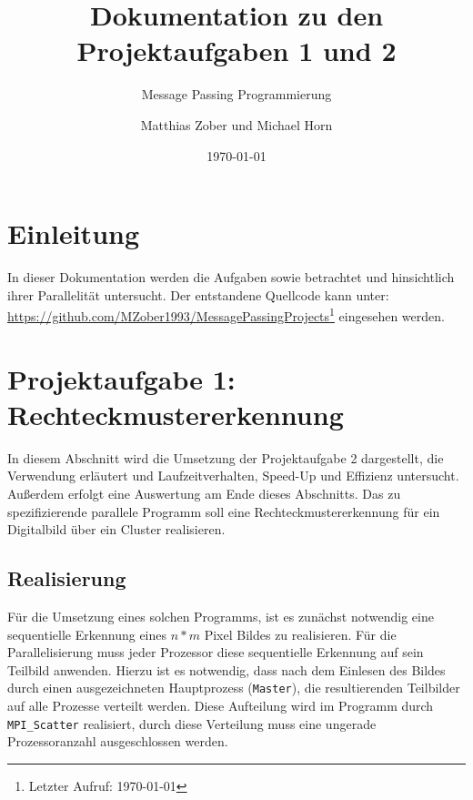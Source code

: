 	
					
\title{Dokumentation zu den Projektaufgaben 1 und 2}
\subtitle{Message Passing Programmierung}

\author{Matthias Zober und Michael Horn}
\date{\today}

\maketitle

\tableofcontents
\pagebreak

\section{Einleitung}
In dieser Dokumentation werden die Aufgaben  sowie  betrachtet und hinsichtlich ihrer Parallelität untersucht.
Der entstandene Quellcode kann unter:\\
\url{https://github.com/MZober1993/MessagePassingProjects}\footnote{Letzter Aufruf: \today}
eingesehen werden.
\section{Projektaufgabe 1: Rechteckmustererkennung}
In diesem Abschnitt wird die Umsetzung der Projektaufgabe 2 dargestellt, die Verwendung erläutert und Laufzeitverhalten, Speed-Up und Effizienz untersucht. Außerdem erfolgt eine Auswertung am Ende dieses Abschnitts.
Das zu spezifizierende parallele Programm soll eine Rechteckmustererkennung für ein Digitalbild über ein Cluster realisieren.
\subsection{Realisierung}

Für die Umsetzung eines solchen Programms, ist es zunächst notwendig eine sequentielle Erkennung eines $n*m$ Pixel Bildes zu realisieren.
Für die Parallelisierung muss jeder Prozessor diese sequentielle Erkennung auf sein Teilbild anwenden. Hierzu ist es notwendig, dass nach dem Einlesen des Bildes durch 
einen ausgezeichneten Hauptprozess (\texttt{Master}), die resultierenden Teilbilder auf alle Prozesse verteilt werden. Diese Aufteilung wird im Programm durch \texttt{MPI\_Scatter} realisiert, durch diese Verteilung muss eine ungerade Prozessoranzahl ausgeschlossen werden.

